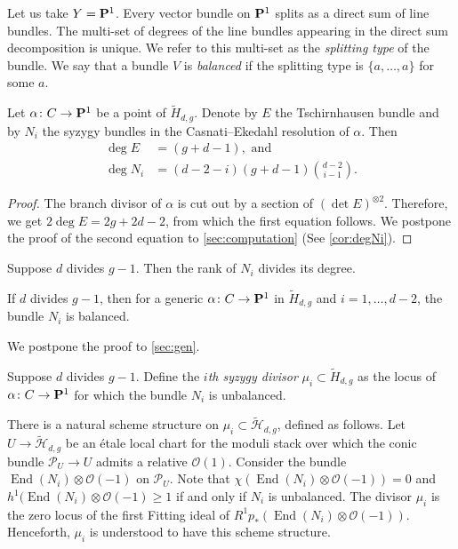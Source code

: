 \documentclass{amsart}
\newcommand{\orb}{\mathcal}
\renewcommand{\O}{{\mathcal O}}
\renewcommand {\P}{{\bf P}}
\providecommand {\from}{{\colon}}
\providecommand{\End}{\operatorname{End}}
\numberwithin{equation}{section}
\begin{document}
Let us take $Y = \P^1$.
Every vector bundle on $\P^1$ splits as a direct sum of line bundles.
The multi-set of degrees of the line bundles appearing in the direct sum decomposition is unique.
We refer to this multi-set as the \emph{splitting type} of the bundle.
We say that a bundle $V$ is \emph{balanced} if the splitting type is $\{a,\dots, a\}$ for some $a$.

\begin{proposition}\label{prop:ni}
  Let $\alpha \from C \to \P^1$ be a point of $\widetilde H_{d,g}$.
  Denote by $E$ the Tschirnhausen bundle and by $N_i$ the syzygy bundles in the Casnati--Ekedahl resolution of $\alpha$.
  Then
  \begin{align*}
    \deg E &= (g+d-1), \text{ and }\\
    \deg N_i &= (d-2-i) (g+d-1) {{d-2} \choose i-1}.
  \end{align*}
\end{proposition}
\begin{proof}
  The branch divisor of $\alpha$ is cut out by a section of $(\det E)^{\otimes 2}$.
  Therefore, we get $2 \deg E = 2g+2d-2$, from which the first equation follows.
  We postpone the proof of the second equation to \autoref{sec:computation} (See \autoref{cor:degNi}). 
\end{proof}

Suppose $d$ divides $g-1$.
Then the rank of $N_i$ divides its degree.
\begin{proposition}\label{prop:gen_balanced}
  If $d$ divides $g-1$, then for a generic $\alpha \from C \to \P^1$ in $\widetilde H_{d,g}$ and $i = 1, \dots, d-2$, the bundle $N_i$ is balanced.
\end{proposition}
We postpone the proof to \autoref{sec:gen}.

\begin{definition}\label{def:main}
  Suppose $d$ divides $g-1$.
  Define the \emph{$i$th syzygy divisor} $\mu_i \subset \widetilde H_{d,g}$ as the locus of $\alpha \from C \to \P^1$ for which the bundle $N_i$ is unbalanced.
\end{definition}

There is a natural scheme structure on $\mu_i \subset \widetilde {\orb H}_{d,g}$, defined as follows.
Let $U \to \widetilde{\orb H}_{d,g}$ be an \'etale local chart for the moduli stack over which the conic bundle $\orb P_U \to U$ admits a relative $\O(1)$.
Consider the bundle $\End(N_i) \otimes \O(-1)$ on $\orb P_U$.
Note that $\chi \left(\End(N_i) \otimes \O(-1)\right) = 0$ and $h^1(\End(N_i) \otimes \O(-1) \geq 1$ if and only if $N_i$ is unbalanced.
The divisor $\mu_i$ is the zero locus of the first Fitting ideal of $R^1p_* \left(\End(N_i) \otimes \O(-1) \right)$.
Henceforth, $\mu_i$ is understood to have this scheme structure.
\end{document}
